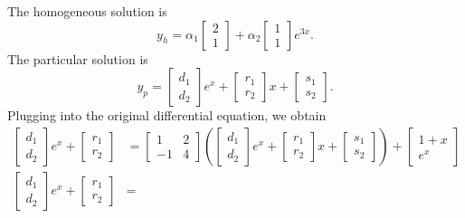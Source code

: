 \begin{soln}
    The homogeneous solution is $$y_h = \alpha_1 
    \begin{bmatrix} 2 \\ 1 \end{bmatrix} + \alpha_2 \begin{bmatrix} 1 \\ 1 \end{bmatrix}e^{3x}.$$
    The particular solution is 
    $$y_p = \begin{bmatrix} d_1 \\ d_2 \end{bmatrix}e^x + \begin{bmatrix} r_1 \\ r_2\end{bmatrix}x + 
    \begin{bmatrix} s_1 \\ s_2\end{bmatrix}.$$ Plugging into the original
    differential equation, we obtain
    \begin{align*}
        \begin{bmatrix} d_1 \\ d_2 \end{bmatrix}e^x + \begin{bmatrix} r_1 \\ r_2\end{bmatrix} &= 
        \begin{bmatrix} 1 & 2 \\ -1 & 4\end{bmatrix}\left(\begin{bmatrix} d_1 \\ d_2 \end{bmatrix}e^x + 
        \begin{bmatrix} r_1 \\ r_2\end{bmatrix}x + \begin{bmatrix} s_1 \\ s_2\end{bmatrix}\right)+
        \begin{bmatrix} 1+x \\ e^x \end{bmatrix} \\
        \begin{bmatrix} d_1 \\ d_2 \end{bmatrix}e^x + \begin{bmatrix} r_1 \\ r_2\end{bmatrix} &=

\end{align*}
\end{soln}
